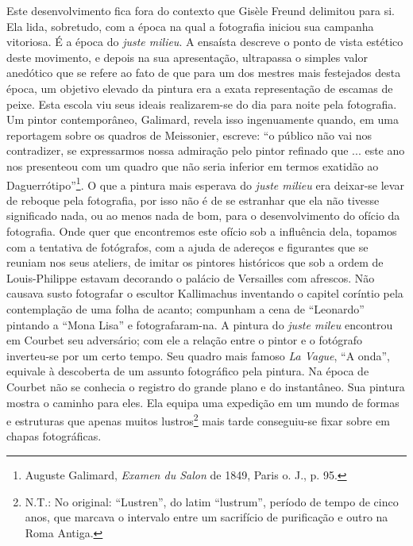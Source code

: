 Este desenvolvimento fica fora do contexto que Gisèle Freund delimitou
para si. Ela lida, sobretudo, com a época na qual a fotografia iniciou
sua campanha vitoriosa. É a época do \emph{juste milieu}. A ensaísta
descreve o ponto de vista estético deste movimento, e depois na sua
apresentação, ultrapassa o simples valor anedótico que se refere ao fato
de que para um dos mestres mais festejados desta época, um objetivo
elevado da pintura era a exata representação de escamas de peixe. Esta
escola viu seus ideais realizarem-se do dia para noite pela fotografia.
Um pintor contemporâneo, Galimard, revela isso ingenuamente quando, em
uma reportagem sobre os quadros de Meissonier, escreve: ``o público não
vai nos contradizer, se expressarmos nossa admiração pelo pintor
refinado que ... este ano nos presenteou com um quadro que não seria
inferior em termos exatidão ao Daguerrótipo''\footnote{Auguste Galimard,
  \emph{Examen du Salon} de 1849, Paris o. J., p. 95.}. O que a pintura
mais esperava do \emph{juste milieu} era deixar-se levar de reboque pela
fotografia, por isso não é de se estranhar que ela não tivesse
significado nada, ou ao menos nada de bom, para o desenvolvimento do
ofício da fotografia. Onde quer que encontremos este ofício sob a
influência dela, topamos com a tentativa de fotógrafos, com a ajuda de
adereços e figurantes que se reuniam nos seus ateliers, de imitar os
pintores históricos que sob a ordem de Louis-Philippe estavam decorando
o palácio de Versailles com afrescos. Não causava susto fotografar o
escultor Kallimachus inventando o capitel coríntio pela contemplação de
uma folha de acanto; compunham a cena de ``Leonardo'' pintando a ``Mona
Lisa'' e fotografaram-na. A pintura do \emph{juste mileu} encontrou em
Courbet seu adversário; com ele a relação entre o pintor e o fotógrafo
inverteu-se por um certo tempo. Seu quadro mais famoso \emph{La Vague},
``A onda'', equivale à descoberta de um assunto fotográfico pela
pintura. Na época de Courbet não se conhecia o registro do grande plano
e do instantâneo. Sua pintura mostra o caminho para eles. Ela equipa uma
expedição em um mundo de formas e estruturas que apenas muitos
lustros\footnote{N.T.: No original: ``Lustren'', do latim ``lustrum'',
  período de tempo de cinco anos, que marcava o intervalo entre um
  sacrifício de purificação e outro na Roma Antiga.} mais tarde
conseguiu-se fixar sobre em chapas fotográficas.

